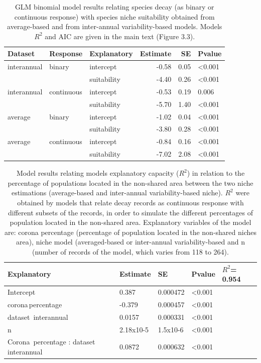 \documentclass[11pt,twoside]{reedthesis}
\begin{document}
\endgroup{}
\begin{table}[H]

\caption[GLM binomial model results relating $Pinus$ decay with species climatic niche suitability]{\label{tab:unnamed-chunk-14}GLM binomial model results relating species decay (as binary or continuous response) with species niche suitability obtained from average-based and from inter-annual variability-based models. Models $R^2$ and AIC are given in the main text (Figure 3.3).}
\centering
\fontsize{8}{10}\selectfont
\begin{tabular}[t]{lllrrl}
\toprule
Dataset & Response & Explanatory & Estimate & SE & Pvalue\\
\midrule
interannual & binary & intercept & -0.58 & 0.05 & <0.001\\
 &  & suitability & -4.40 & 0.26 & <0.001\\
interannual & continuous & intercept & -0.53 & 0.19 & 0.006\\
 &  & suitability & -5.70 & 1.40 & <0.001\\
average & binary & intercept & -1.02 & 0.04 & <0.001\\
 &  & suitability & -3.80 & 0.28 & <0.001\\
average & continuous & intercept & -0.84 & 0.16 & <0.001\\
 &  & suitability & -7.02 & 2.08 & <0.001\\
\bottomrule
\end{tabular}
\end{table}
\begin{table}[H]

\caption[Model results relating models explanatory capacity in relation to the percentage of populations located in the non-shared niche space]{\label{tab:unnamed-chunk-15}Model results relating models explanatory capacity ($R^2$) in relation to the percentage of populations located in the non-shared area between the two niche estimations (average-based and inter-annual variability-based niche). $R^2$ were obtained by models that relate decay records as continuous response with different subsets of the records, in order to simulate the different percentages of population located in the non-shared area. Explanatory variables of the model are: corona percentage (percentage of population located in the non-shared niches area), niche model (averaged-based or inter-annual variability-based and n (number of records of the model, which varies from 118 to 264).}
\centering
\fontsize{8}{10}\selectfont
\begin{tabular}[t]{lllll}
\toprule
Explanatory & Estimate & SE & Pvalue & $R^2$= 0.954\\
\midrule
Intercept & 0.387 & 0.000472 & <0.001 & \\
corona\,percentage & -0.379 & 0.000457 & <0.001 & \\
dataset\, interannual & 0.0157 & 0.000331 & <0.001 & \\
n & 2.18x10-5 & 1.5x10-6 & <0.001 & \\
Corona\, percentage : dataset\, interannual & 0.0872 & 0.000632 & <0.001 & \\
\bottomrule
\end{tabular}
\end{table}
\end{document}
